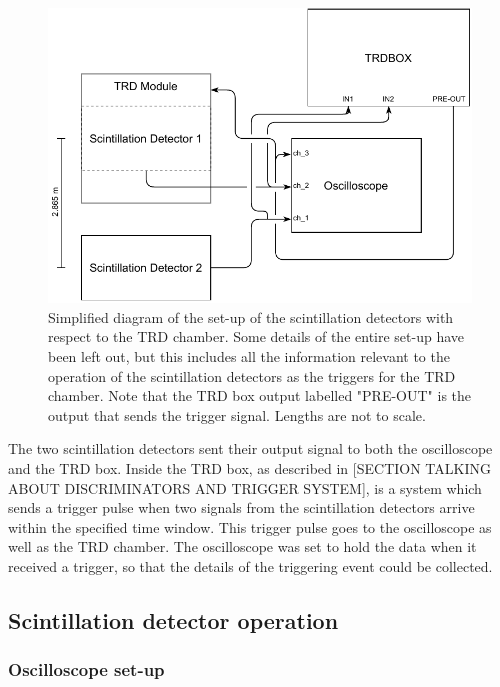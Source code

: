 \documentclass[11pt]{article}
\numberwithin{equation}{section}
\numberwithin{figure}{section}
\numberwithin{table}{section}
\begin{document}
\begin{figure}[h]
    \begin{center}
        \includegraphics{Plots/setup.pdf}
        \caption{Simplified diagram of the set-up of the scintillation detectors with respect to the TRD chamber. Some details of the entire set-up have been left out, but this includes all the information relevant to the operation of the scintillation detectors as the triggers for the TRD chamber. Note that the TRD box output labelled "PRE-OUT" is the output that sends the trigger signal. Lengths are not to scale.}
        \label{fig:scintillator setup}
    \end{center}
\end{figure}

\par The two scintillation detectors sent their output signal to both the oscilloscope and the TRD box. Inside the TRD box, as described in [SECTION TALKING ABOUT DISCRIMINATORS AND TRIGGER SYSTEM], is a system which sends a trigger pulse when two signals from the scintillation detectors arrive within the specified time window. This trigger pulse goes to the oscilloscope as well as the TRD chamber. The oscilloscope was set to hold the data when it received a trigger, so that the details of the triggering event could be collected.  

\subsection{Scintillation detector operation}\label{sec:Scintillation detector operation}
\subsubsection{Oscilloscope set-up}\label{sec:Oscilloscope set-up}
\end{document}
